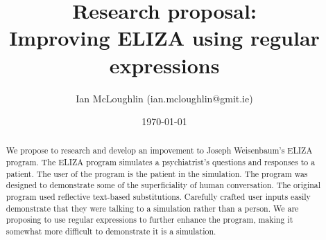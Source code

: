 
\title{Research proposal: \\ Improving ELIZA using regular expressions}
\author{Ian McLoughlin (ian.mcloughlin@gmit.ie)}
\date{\today}




  \maketitle

  \begin{abstract}
    We propose to research and develop an impovement to Joseph Weisenbaum's
    ELIZA program. The ELIZA program simulates a psychiatrist's questions and
    responses to a patient. The user of the program is the patient in the
    simulation. The program was designed to demonstrate some of the
    superficiality of human conversation. The original program used
    reflective text-based substitutions. Carefully crafted user inputs
    easily demonstrate that they were talking to a simulation rather than a
    person. We are proposing to use regular expressions to further enhance the
    program, making it somewhat more difficult to demonstrate it is a
    simulation.
  \end{abstract}

